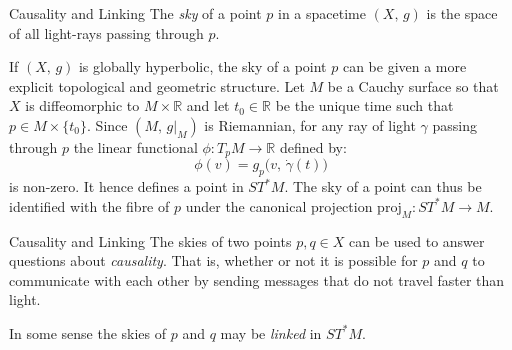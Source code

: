 \documentclass{beamer}
\begin{document}
    \begin{frame}{Causality and Linking}
        The \textit{sky} of a point $p$ in a spacetime $(X,\,g)$ is the space
        of all light-rays passing through $p$.
        \par\hfill\par
        If $(X,\,g)$ is globally hyperbolic, the sky of a point $p$ can be given
        a more explicit topological and geometric structure. Let $M$ be a
        Cauchy surface so that $X$ is diffeomorphic to $M\times\mathbb{R}$ and
        let $t_{0}\in\mathbb{R}$ be the unique time such that
        $p\in{M}\times\{t_{0}\}$. Since $(M,\,g|_{M})$ is Riemannian, for any
        ray of light $\gamma$ passing through $p$ the linear functional
        $\phi:T_{p}M\rightarrow\mathbb{R}$ defined by:
        \begin{equation}
            \phi(v)=g_{p}\big(v,\,\dot{\gamma}(t)\big)
        \end{equation}
        is non-zero. It hence defines a point in $ST^{*}M$. The sky of a point
        can thus be identified with the fibre of $p$ under the canonical
        projection $\textrm{proj}_{M}:ST^{*}M\rightarrow{M}$.
    \end{frame}
    \begin{frame}{Causality and Linking}
        The skies of two points $p,q\in{X}$ can be used to answer questions
        about \textit{causality}. That is, whether or not it is possible for
        $p$ and $q$ to communicate with each other by sending messages that
        do not travel faster than light.
        \par\hfill\par
        In some sense the skies of $p$ and $q$ may be \textit{linked} in
        $ST^{*}M$.
    \end{frame}
\end{document}

